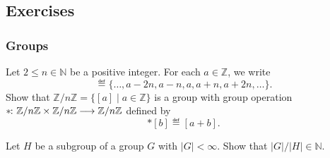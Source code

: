 \documentclass[a4paper, oneside, 12pt]{amsart}
\begin{document}











\cleardoublepage
\subsection{Exercises}\label{sec:Groups-exercises}
\subsubsection*{Groups}

\begin{exercise}\label{exe:cyclic-groups}
  Let \(2\leq n \in \mathbb{N}\) be a positive integer.
  For each \(a\in \mathbb{Z}\), we write
  \begin{equation*}
    [a] \eqdef \{\dots, a-2n, a-n, a, a+n , a+2n, \dots \}.
  \end{equation*}
  Show that \( \mathbb{Z}/ n \mathbb{Z} =\{[a] \mid a \in \mathbb{Z}\}\) is a group with group operation \(* \from \mathbb{Z}/n \mathbb{Z} \times \mathbb{Z}/ n \mathbb{Z} \to \mathbb{Z}/ n \mathbb{Z}\) defined by
  \begin{equation*}
    [a] * [b] \eqdef [a+b].
  \end{equation*}
\end{exercise}

\begin{exercise}
  Let \(H\) be a subgroup of a group \(G\) with \(|G|< \infty\).
  Show that \(|G|/|H| \in \mathbb{N}\).
\end{exercise}
\end{document}
